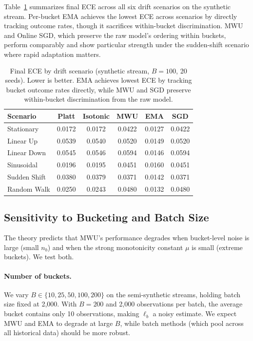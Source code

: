 \documentclass[12pt, letterpaper]{article}
\theoremstyle{definition}
\theoremstyle{remark}
\begin{document}
Table~\ref{tab:drift_scenarios} summarizes final ECE across all six drift scenarios on the synthetic stream. Per-bucket EMA achieves the lowest ECE across scenarios by directly tracking outcome rates, though it sacrifices within-bucket discrimination. MWU and Online SGD, which preserve the raw model's ordering within buckets, perform comparably and show particular strength under the sudden-shift scenario where rapid adaptation matters.

\begin{table}[H]
\centering
\begin{tabular}{@{}lccccc@{}}
\toprule
Scenario & Platt & Isotonic & MWU & EMA & SGD\\
\midrule
Stationary & 0.0172 & 0.0172 & 0.0422 & 0.0127 & 0.0422\\
Linear Up & 0.0539 & 0.0540 & 0.0520 & 0.0149 & 0.0520\\
Linear Down & 0.0545 & 0.0546 & 0.0594 & 0.0146 & 0.0594\\
Sinusoidal & 0.0196 & 0.0195 & 0.0451 & 0.0160 & 0.0451\\
Sudden Shift & 0.0380 & 0.0379 & 0.0371 & 0.0142 & 0.0371\\
Random Walk & 0.0250 & 0.0243 & 0.0480 & 0.0132 & 0.0480\\
\bottomrule
\end{tabular}
\caption{Final ECE by drift scenario (synthetic stream, $B=100$, 20 seeds). Lower is better. EMA achieves lowest ECE by tracking bucket outcome rates directly, while MWU and SGD preserve within-bucket discrimination from the raw model.}
\label{tab:drift_scenarios}
\end{table}

\subsection{Sensitivity to Bucketing and Batch Size}

The theory predicts that MWU's performance degrades when bucket-level noise is large (small $n_b$) and when the strong monotonicity constant $\mu$ is small (extreme buckets). We test both.

\paragraph{Number of buckets.} We vary $B \in \{10, 25, 50, 100, 200\}$ on the semi-synthetic streams, holding batch size fixed at 2,000. With $B = 200$ and 2,000 observations per batch, the average bucket contains only 10 observations, making $\ell_b$ a noisy estimate. We expect MWU and EMA to degrade at large $B$, while batch methods (which pool across all historical data) should be more robust.
\end{document}
